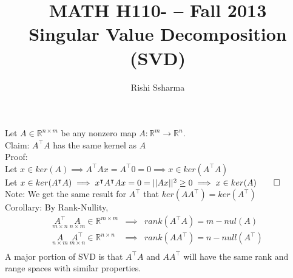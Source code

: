 \documentclass[11pt]{article}
\author{Rishi Ssharma}
\title{MATH H110- -- Fall 2013\\  Singular Value Decomposition (SVD)}
\begin{document}
\maketitle

Let $A \in \mathbb{R}^{n \times m}$ be any nonzero map $A: \mathbb{R}^m \to \mathbb{R}^n$.\\

Claim: $A^\intercal A$ has the same kernel as $A$\\
Proof: \\\indent Let $x \in ker(A) \implies A^\intercal Ax = A^\intercal 0 = 0 \implies x \in ker(A^\intercal A)$\\\indent Let $x \in ker(A^\intercal A) \implies x^\intercal A^\intercal Ax = 0 = \vert\vert Ax \vert\vert^2 \geq 0 \implies x \in ker(A) \qed$\\

Note: We get the same result for $A^\intercal$ that $ker(AA^\intercal) = ker(A^\intercal)$\\

Corollary: By Rank-Nullity,
\begin{eqnarray*}
\underset{m \times n}{A^\intercal}\ \underset{n \times m}{A} \in \mathbb{R}^{m \times m} &\implies& rank(A^\intercal A) = m - nul(A)\\
\underset{n \times m}{A}\ \underset{m \times n}{A^\intercal} \in \mathbb{R}^{n \times n} &\implies& rank(AA^\intercal) = n - null(A^\intercal)\\
\end{eqnarray*}
A major portion of SVD is that $A^\intercal A$ and $AA^\intercal$ will have the same rank and range spaces with similar properties.\\
\end{document}
